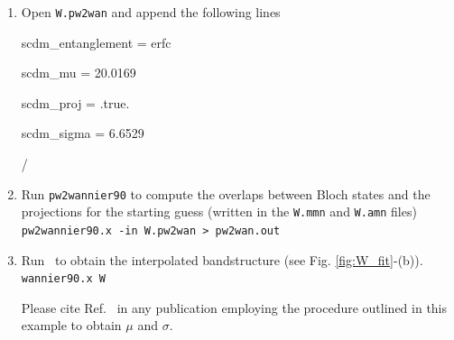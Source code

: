 \documentclass[a4paper,11pt,twoside]{article}
\begin{document}
\begin{enumerate}
	{\tt y = 0.5 * erfc( ( x - A0 ) / A1 )}  \\

Select 2 as number of parameters, give 40 as initial condition for {\tt A0} and 7 for {\tt A1}. Click {\tt Apply}. A new window should pop up with the stats of the fitting. In particular you should find a {\tt Correlation coefficient} of 0.96 and a value of $39.9756$ for {\tt A0} and $6.6529$ for {\tt A1}. These are the value of $\mu_{fit}$ and $\sigma_{fit}$ we are going to use for the SCDM method. In particular, $\mu_{SCDM} = \mu_{fit} - 3\sigma_{fit} = 20.0169$ eV and $\sigma_{SCDM} = \sigma_{fit} = 6.6529$ eV. The motivation for this specific choice of $\mu_{fit}$ and $\sigma_{fit}$ may be found in Ref.~\cite{Vitale2019automated}, where the authors also show validation of this approach on a dataset of 200 materials. You should now see the fitting function, as well as the projectabilities, in the graph (see Fig. \ref{fig:W_fit}-(a)).\\

        \item Open {\tt W.pw2wan} and append the following lines
	{\tt 
	
	scdm\_entanglement = \textquotesingle erfc\textquotesingle

  	scdm\_mu =  20.0169

  	scdm\_proj = .true.

  	scdm\_sigma =   6.6529

 	/}

	\item Run {\tt pw2wannier90} to compute the overlaps between Bloch
	states and the projections for the starting guess (written in the
	{\tt W.mmn} and {\tt  W.amn} files)\\
	{\tt pw2wannier90.x -in W.pw2wan > pw2wan.out}
	
	\item Run \wannier\ to obtain the interpolated bandstructure (see Fig. \ref{fig:W_fit}-(b)).\\
	{\tt wannier90.x W}

Please cite Ref.~\cite{Vitale2019automated} in any publication employing the procedure outlined in this example to obtain $\mu$ and $\sigma$.
\end{enumerate}
\end{document}
